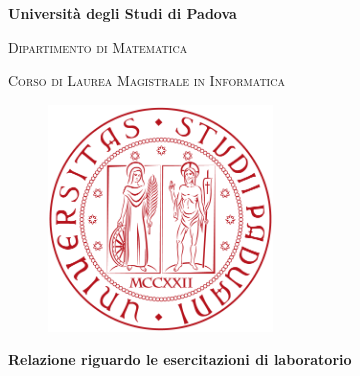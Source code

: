 \documentclass[a4paper, 11pt]{article} %
\begin{document}
\begin{titlepage}
	
	\begin{center}
		
		\begin{LARGE}
			\textbf{Università degli Studi di Padova}\\
		\end{LARGE}
		
		\vspace{10pt}
		
		\begin{Large}
			\textsc{Dipartimento di Matematica}\\
		\end{Large}
		
		\vspace{10pt}
		
		\begin{large}
			\textsc{Corso di Laurea Magistrale in Informatica}\\
		\end{large}
		
		\vspace{30pt}
		\begin{figure}[htbp]
			\begin{center}
				\includegraphics[height=6cm]{immagini/logo-unipd}
			\end{center}
		\end{figure}
		\vspace{10pt} 
		
		\begin{LARGE}
			\begin{center}
				\textbf{Relazione riguardo le esercitazioni di laboratorio}\\
			\end{center}
		\end{LARGE}
		

\end{center}
\end{titlepage}
\end{document}
